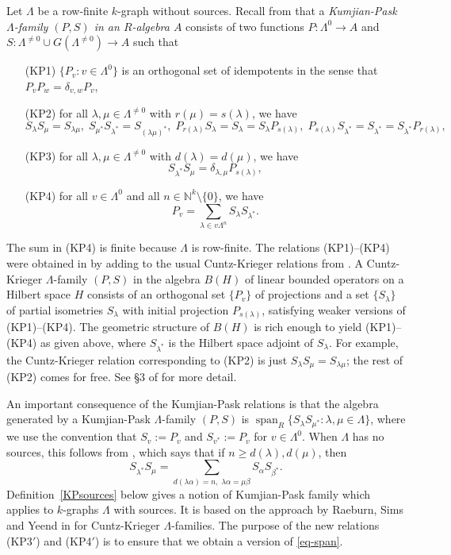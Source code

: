 \documentclass[a4paper,12pt]{amsart}
\numberwithin{equation}{section}
\theoremstyle{definition}
\theoremstyle{remark}
\begin{document}
Let $\Lambda$ be a row-finite $k$-graph without sources.  Recall from \cite[Definition~3.1]{ACaHR} that a
 \emph{Kumjian-Pask $\Lambda$-family $(P,S)$ \label{oldKPrelations}
in an $R$-algebra $A$} consists of two functions $P:\Lambda^0\to A$ and 
$S:\Lambda^{\not=0}\cup G(\Lambda^{\not=0})\to A$ such that\label{KPwithoutsources}
\begin{enumerate}
\item[(KP1)] $\{P_v:v\in \Lambda^0\}$ is an  orthogonal set of idempotents in the sense 
that $P_vP_w=\delta_{v,w}P_v$,
\item[(KP2)] for all $\lambda, \mu\in\Lambda^{\neq 0}$ with $r(\mu) = s(\lambda)$, we have
\[
S_{\lambda}S_{\mu} = S_{\lambda\mu}, \; S_{\mu^*}S_{\lambda^*} = S_{(\lambda\mu)^*}, \;
 P_{r(\lambda)}S_{\lambda} = S_{\lambda} = S_{\lambda}P_{s(\lambda)}, \;
  P_{s(\lambda)}S_{\lambda^*} = S_{\lambda^*} = S_{\lambda^*}P_{r(\lambda)},
\]
\item[(KP3)] for all $\lambda, \mu \in\Lambda^{\neq 0}$ with $d(\lambda) = d(\mu)$, we have
\[
S_{\lambda^*}S_{\mu} = \delta_{\lambda,\mu}P_{s(\lambda)},
\]
\item[(KP4)] for all $v\in\Lambda^0$ and all $n\in {\mathbb N}^k\setminus \{0\}$, we have
\[
P_v = \sum_{\lambda\in v\Lambda^n} S_{\lambda}S_{\lambda^*}.
\]
\end{enumerate} 

The sum in (KP4) is finite because $\Lambda$ is row-finite. 
The  relations (KP1)--(KP4) were obtained in \cite[\S3]{ACaHR} by adding to the usual 
Cuntz-Krieger relations from \cite{KumPas00}.  A Cuntz-Krieger $\Lambda$-family $(P,S)$  
in the algebra $B(H)$  of linear bounded operators on a Hilbert space $H$ consists of an
 orthogonal  set $\{P_v\}$ of projections  and a set  $\{S_\lambda\}$  of partial isometries 
$S_\lambda$ with initial projection $P_{s(\lambda)}$, satisfying weaker versions of  (KP1)--(KP4).
The geometric structure of $B(H)$ is rich enough  to yield (KP1)--(KP4) as given above, where 
$S_{\lambda^*}$  is the Hilbert space adjoint of $S_\lambda$. For example, the Cuntz-Krieger relation 
corresponding to 
(KP2) is just $S_{\lambda}S_{\mu}= S_{\lambda\mu}$; the rest of (KP2) comes for free.   
See \S3 of \cite{ACaHR} for more detail. \label{page5}

An important consequence of the  Kumjian-Pask relations is that the algebra generated by a 
Kumjian-Pask $\Lambda$-family $(P,S)$ is ${\operatorname{\mathrm{span}}}_R\{S_\lambda S_{\mu^*}:\lambda,\mu\in \Lambda\}$, 
where we use the convention that $S_v:=P_v$ and $S_{v^*}:=P_{v}$ for $v\in \Lambda^0$. When  $\Lambda$
 has no sources, this follows from \cite[Lemma~3.3]{ACaHR}, which says that if $n\geq d(\lambda), d(\mu)$, then 
\begin{equation}\label{eq-span}
S_{\lambda^*}S_{\mu} = \sum_{d(\lambda\alpha)=n,\;\lambda\alpha = \mu\beta}S_{\alpha}S_{\beta^*}.
\end{equation}
Definition~\ref{KPsources} below gives a notion of Kumjian-Pask family which applies to $k$-graphs 
$\Lambda$ with sources. It is based on the approach by Raeburn, Sims and Yeend in \cite{RSY03} for 
Cuntz-Krieger $\Lambda$-families. The purpose of the new relations (KP3$'$) and (KP4$'$) is to ensure 
that we obtain a version of \eqref{eq-span}. 
\end{document}
